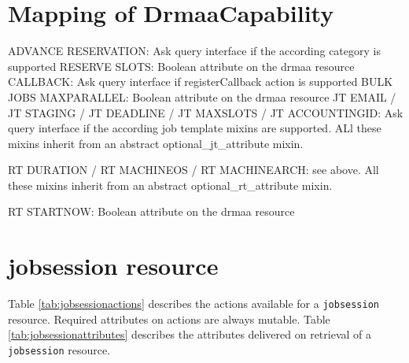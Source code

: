 \documentclass[10pt]{article}
\newcommand{\h}[1]{\lstinline|#1|}
\begin{document}

\section{Mapping of DrmaaCapability}

ADVANCE RESERVATION: Ask query interface if the according category is supported
RESERVE SLOTS: Boolean attribute on the drmaa resource
CALLBACK: Ask query interface if registerCallback action is supported
BULK JOBS MAXPARALLEL: Boolean attribute on the drmaa resource
JT EMAIL / JT STAGING / JT DEADLINE / JT MAXSLOTS / JT ACCOUNTINGID: Ask query interface if the according job template mixins are supported. ALl these mixins inherit from an
abstract optional\_jt\_attribute mixin.


RT DURATION / RT MACHINEOS / RT MACHINEARCH: see above.  All these mixins inherit from an
abstract optional\_rt\_attribute mixin.

RT STARTNOW: Boolean attribute on the drmaa resource


\section{jobsession resource}

Table \ref{tab:jobsessionactions} describes the actions available for a \h{jobsession} resource. Required attributes on actions are always mutable. Table \ref{tab:jobsessionattributes} describes the attributes delivered on retrieval of a \h{jobsession} resource.
\end{document}
